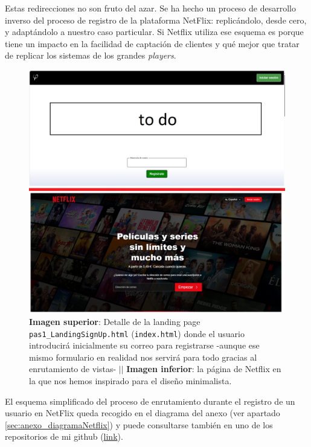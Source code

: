 \documentclass[a4paper,12pt]{report}
\begin{document}
	

	
	Estas redirecciones no son fruto del azar. Se ha hecho un proceso de desarrollo inverso del proceso de registro de la plataforma NetFlix: replicándolo, desde cero, y adaptándolo a nuestro caso particular. Si Netflix utiliza ese esquema es porque tiene un impacto en la facilidad de captación de clientes y qué mejor que tratar de replicar los sistemas de los grandes \textit{players}.
	
	\setlength{\belowcaptionskip}{3pt}
	\FloatBarrier
	\begin{figure}[H]
		\centering
		\caption{\textbf{Imagen superior}: Detalle de la landing page \texttt{pas1\_LandingSignUp.html} (\texttt{index.html}) donde el usuario introducirá inicialmente su correo para registrarse -aunque ese mismo formulario en realidad nos servirá para todo gracias al enrutamiento de vistas- $||$ \textbf{Imagen inferior}: la página de Netflix en la que nos hemos inspirado para el diseño minimalista.}
		\includegraphics[width=1\textwidth]{img/landingSignUp.png}

		\label{fig:landingSignUpDETALL} 
	\end{figure}
	\FloatBarrier
	
	El esquema simplificado del proceso de enrutamiento durante el registro de un usuario en NetFlix queda recogido en el diagrama del anexo (ver apartado \ref{sec:anexo_diagramaNetflix}) y puede consultarse también en uno de los repositorios de mi github (\href{https://www.github.com/miApp}{link}). 
	
\end{document}
